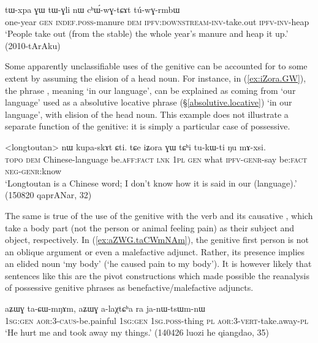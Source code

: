 \begin{exe}
\ex \label{ex:tWxpa.GW.tWGli}
\gll  tɯ-xpa ɣɯ tɯ-ɣli nɯ cʰɯ́-wɣ-tɕɤt tú-wɣ-rmbɯ  \\
one-year \textsc{gen} \textsc{indef}.\textsc{poss}-manure \textsc{dem} \textsc{ipfv}:\textsc{downstream}-\textsc{inv}-take.out \textsc{ipfv}-\textsc{inv}-heap \\
\glt `People take out (from the stable) the whole year's manure and heap it up.' (2010-tArAku)
\end{exe}

Some apparently unclassifiable uses of the genitive can be accounted for to some extent by assuming the elision of a head noun.  For instance, in (\ref{ex:iZora.GW}), the phrase , meaning `in our language', can be explained as coming from  `our language' used as a absolutive locative phrase (§\ref{absolutive.locative}) `in our language', with elision of the head noun. This example does not illustrate a separate function of the genitive: it is simply a particular case of possessive.

\begin{exe}
\ex \label{ex:iZora.GW}
\gll  <longtoutan> nɯ kupa-skɤt ɕti. tɕe iʑora ɣɯ tɕʰi tu-kɯ-ti ŋu mɤ-xsi. \\
\textsc{topo} \textsc{dem} Chinese-language be.\textsc{aff}:\textsc{fact} \textsc{lnk} \textsc{1pl} \textsc{gen} what \textsc{ipfv}-\textsc{genr}-say be:\textsc{fact} \textsc{neg}-\textsc{genr}:know \\
\glt `Longtoutan is a Chinese word; I don't know how it is said in our (language).'  (150820 qaprANar, 32)
\end{exe}

The same is true of the use of the genitive with the verb  and its causative , which take a body part (not the person or animal feeling pain) as their subject and object, respectively. In (\ref{ex:aZWG.taCWmNAm}), the genitive first person  is not an oblique argument or even a malefactive adjunct. Rather, its presence implies an elided noun  `my body' (`he caused pain to my body'). It is however likely that sentences like this are the pivot constructions which made possible the reanalysis of possessive genitive phrases as benefactive/malefactive adjuncts.

\begin{exe}
\ex \label{ex:aZWG.taCWmNAm}
\gll aʑɯɣ ta-ɕɯ-mŋɤm, aʑɯɣ a-laχtɕʰa ra ja-nɯ-tsɯm-nɯ \\
\textsc{1sg}:\textsc{gen} \textsc{aor}:3\flobv{}-\textsc{caus}-be.painful \textsc{1sg}:\textsc{gen} \textsc{1sg}.\textsc{poss}-thing \textsc{pl} \textsc{aor}:3\flobv{}-\textsc{vert}-take.away-\textsc{pl} \\
\glt `He hurt me and took away my things.' (140426 luozi he qiangdao, 35)
\end{exe}

